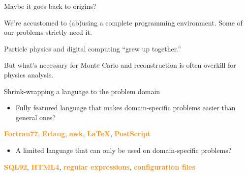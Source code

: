 \documentclass[aspectratio=169]{beamer}
\begin{document}
\begin{frame}{Maybe it goes back to origins?}
\large
\vspace{0.5 cm}

We're accustomed to (ab)using a complete programming environment. Some of our problems strictly need it.

\vspace{0.5 cm}
Particle physics and digital computing ``grew up together.''

\vspace{1 cm}
But what's necessary for Monte Carlo and reconstruction is often overkill for physics analysis.
\end{frame}

\begin{frame}{Shrink-wrapping a language to the problem domain}
\large
\begin{itemize}
\item Fully featured language that makes domain-specific problems easier than general ones?
\end{itemize}

\begin{center}
\textcolor{darkorange}{\bf Fortran77}, \textcolor{darkorange}{\bf Erlang}, \textcolor{darkorange}{\bf awk}, \textcolor{darkorange}{\bf \LaTeX}, \textcolor{darkorange}{\bf PostScript}
\end{center}

\begin{itemize}
\item A limited language that can only be used on domain-specific problems?
\end{itemize}

\begin{center}
\textcolor{darkorange}{\bf SQL92}, \textcolor{darkorange}{\bf HTML4}, \textcolor{darkorange}{\bf regular expressions}, \textcolor{darkorange}{\bf configuration files}
\end{center}
\end{frame}
\end{document}
